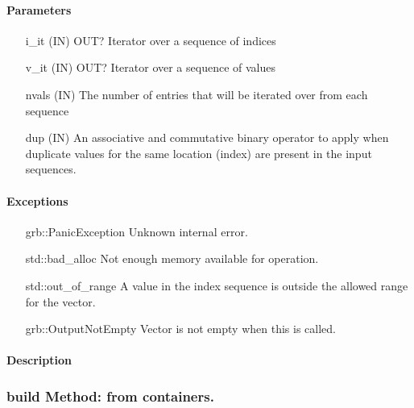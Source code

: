 \paragraph{Parameters}

\begin{itemize}[leftmargin=1.1in]
    \item[{\sf i\_it}]   ({\sf IN}) OUT? Iterator over a sequence of indices
    \item[{\sf v\_it}]   ({\sf IN}) OUT? Iterator over a sequence of values
    \item[{\sf nvals}]   ({\sf IN}) The number of entries that will be iterated over from each sequence
    \item[{\sf dup}]     ({\sf IN}) An associative and commutative binary operator
                                    to apply when duplicate values for the same
                                    location (index) are present in the input sequences.
\end{itemize}

\paragraph{Exceptions}

\begin{itemize}[leftmargin=2.1in]
    \item[{\sf grb::PanicException}]   Unknown internal error.
    \item[{\sf std::bad\_alloc}]       Not enough memory available for operation.
    \item[{\sf std::out\_of\_range}]   A value in the index sequence is outside the
                                       allowed range for the vector.
    \item[{\sf grb::OutputNotEmpty}]   Vector is not empty when this is called.                                  
\end{itemize}

\paragraph{Description}

\subsubsection{{\sf build} Method: from containers.}


